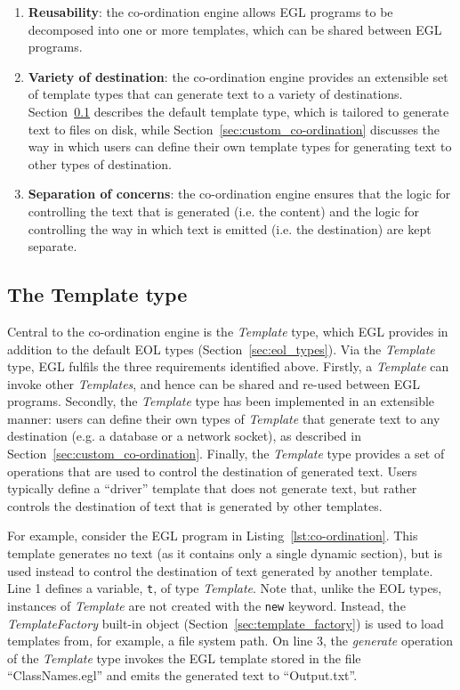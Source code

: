 \begin{enumerate}
	\item \textbf{Reusability}: the co-ordination engine allows EGL programs to be decomposed into one or more templates, which can be shared between EGL programs.

	\item \textbf{Variety of destination}: the co-ordination engine provides an extensible set of template types that can generate text to a variety of destinations. Section~\ref{sec:egl_template_type} describes the default template type, which is tailored to generate text to files on disk, while Section~\ref{sec:custom_co-ordination} discusses the way in  which users can define their own template types for generating text to other types of destination.
	
	\item \textbf{Separation of concerns}: the co-ordination engine ensures that the logic for controlling the text that is generated (i.e. the content) and the logic for controlling the way in which text is emitted (i.e. the destination) are kept separate.
\end{enumerate}

\subsection{The Template type}
\label{sec:egl_template_type}
Central to the co-ordination engine is the \emph{Template} type, which EGL provides in addition to the default EOL types (Section~\ref{sec:eol_types}). Via the \emph{Template} type, EGL fulfils the three requirements identified above. Firstly, a \emph{Template} can invoke other \emph{Templates}, and hence can be shared and re-used between EGL programs. Secondly, the \emph{Template} type has been implemented in an extensible manner: users can define their own types of \emph{Template} that generate text to any destination (e.g. a database or a network socket), as described in Section~\ref{sec:custom_co-ordination}. Finally, the \emph{Template} type provides a set of operations that are used to control the destination of generated text. Users typically define a ``driver'' template that does not generate text, but rather controls the destination of text that is generated by other templates. 

For example, consider the EGL program in Listing~\ref{lst:co-ordination}. This template generates no text (as it contains only a single dynamic section), but is used instead to control the destination of text generated by another template. Line 1 defines a variable, \texttt{t}, of type \emph{Template}. Note that, unlike the EOL types, instances of \emph{Template} are not created with the \texttt{new} keyword. Instead, the \emph{TemplateFactory} built-in object (Section~\ref{sec:template_factory}) is used to load templates from, for example, a file system path. On line 3, the \emph{generate} operation of the \emph{Template} type invokes the EGL template stored in the file ``ClassNames.egl'' and emits the generated text to ``Output.txt''.

